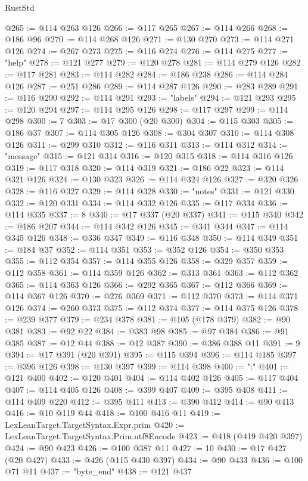 \begin{lexlean}{RustStd}
\begin{coremodule}
{\begin{coremodule}
{{{{{{{{{{{{{{{{{{{{{{{{{{{{{{{{{{{{{{{{{{{{{{{{{{@265 := @114 @263 @126
@266 := @117 @265
@267 := @114 @266
@268 := @186 @96
@270 := @114 @268 @126
@271 := @130 @270
@273 := @114 @271 @126
@274 := @267 @273
@275 := @116 @274
@276 := @114 @275
@277 := "help"
@278 := @121 @277
@279 := @120 @278
@281 := @114 @279 @126
@282 := @117 @281
@283 := @114 @282
@284 := @186 @238
@286 := @114 @284 @126
@287 := @251 @286
@289 := @114 @287 @126
@290 := @283 @289
@291 := @116 @290
@292 := @114 @291
@293 := "labels"
@294 := @121 @293
@295 := @120 @294
@297 := @114 @295 @126
@298 := @117 @297
@299 := @114 @298
@300 := 7
@303 := @17 @300 (@20 @300)
@304 := @115 @303
@305 := @186 @37
@307 := @114 @305 @126
@308 := @304 @307
@310 := @114 @308 @126
@311 := @299 @310
@312 := @116 @311
@313 := @114 @312
@314 := "message"
@315 := @121 @314
@316 := @120 @315
@318 := @114 @316 @126
@319 := @117 @318
@320 := @114 @319
@321 := @186 @22
@323 := @114 @321 @126
@324 := @130 @323
@326 := @114 @324 @126
@327 := @320 @326
@328 := @116 @327
@329 := @114 @328
@330 := "notes"
@331 := @121 @330
@332 := @120 @331
@334 := @114 @332 @126
@335 := @117 @334
@336 := @114 @335
@337 := 8
@340 := @17 @337 (@20 @337)
@341 := @115 @340
@342 := @186 @207
@344 := @114 @342 @126
@345 := @341 @344
@347 := @114 @345 @126
@348 := @336 @347
@349 := @116 @348
@350 := @114 @349
@351 := @184 @37
@352 := @114 @351
@353 := @352 @126
@354 := @350 @353
@355 := @112 @354
@357 := @114 @355 @126
@358 := @329 @357
@359 := @112 @358
@361 := @114 @359 @126
@362 := @313 @361
@363 := @112 @362
@365 := @114 @363 @126
@366 := @292 @365
@367 := @112 @366
@369 := @114 @367 @126
@370 := @276 @369
@371 := @112 @370
@373 := @114 @371 @126
@374 := @260 @373
@375 := @112 @374
@377 := @114 @375 @126
@378 := @239 @377
@379 := @234 @378
@381 := @105 (@178 @379)
@382 := @90 @381
@383 := @92 @22
@384 := @383 @98
@385 := @97 @384
@386 := @91 @385
@387 := @12 @44
@388 := @12 @387
@390 := @386 @388 @11
@391 := 9
@394 := @17 @391 (@20 @391)
@395 := @115 @394
@396 := @114 @185
@397 := @396 @126
@398 := @130 @397
@399 := @114 @398
@400 := ":"
@401 := @121 @400
@402 := @120 @401
@404 := @114 @402 @126
@405 := @117 @404
@407 := @114 @405 @126
@408 := @399 @407
@409 := @395 @408
@411 := @114 @409 @220
@412 := @395 @411
@413 := @390 @412
@414 := @90 @413
@416 := @10 @119 @44
@418 := @100 @416 @11
@419 := LexLeanTarget.TargetSyntax.Expr.prim
@420 := LexLeanTarget.TargetSyntax.Prim.utf8Encode
@423 := @418 (@419 @420 @397)
@424 := @90 @423
@426 := @100 @387 @11
@427 := 10
@430 := @17 @427 (@20 @427)
@433 := @426 (@115 @430 @397)
@434 := @90 @433
@436 := @100 @71 @11
@437 := "byte_end"
@438 := @121 @437
}}}}}}}}}}}}}}}}}}}}}}}}}}}}}}}}}}}}}}}}}}}}}}}}}}
\end{coremodule}}
\end{coremodule}
\end{lexlean}
